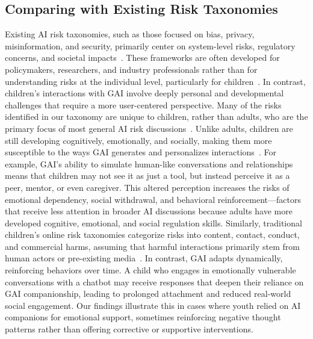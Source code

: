 \subsection{Comparing with Existing Risk Taxonomies}
\vspace{-3pt}
Existing AI risk taxonomies, such as those focused on bias, privacy, misinformation, and security, primarily center on system-level risks, regulatory concerns, and societal impacts~\cite{slattery2024ai,AVIDDatabasea}. These frameworks are often developed for policymakers, researchers, and industry professionals rather than for understanding risks at the individual level, particularly for children~\cite{zeng2024ai,wang2023decodingtrust}. In contrast, children’s interactions with GAI involve deeply personal and developmental challenges that require a more user-centered perspective. Many of the risks identified in our taxonomy are unique to children, rather than adults, who are the primary focus of most general AI risk discussions~\cite{slattery2024ai}. Unlike adults, children are still developing cognitively, emotionally, and socially, making them more susceptible to the ways GAI generates and personalizes interactions~\cite{neugnot2024future,hasse2019youth,casey2008adolescent,steinberg2018around}. For example, GAI’s ability to simulate human-like conversations and relationships means that children may not see it as just a tool, but instead perceive it as a peer, mentor, or even caregiver. This altered perception increases the risks of emotional dependency, social withdrawal, and behavioral reinforcement—factors that receive less attention in broader AI discussions because adults have more developed cognitive, emotional, and social regulation skills. Similarly, traditional children’s online risk taxonomies categorize risks into content, contact, conduct, and commercial harms, assuming that harmful interactions primarily stem from human actors or pre-existing media~\cite{livingstone2014their}. In contrast, GAI adapts dynamically, reinforcing behaviors over time. A child who engages in emotionally vulnerable conversations with a chatbot may receive responses that deepen their reliance on GAI companionship, leading to prolonged attachment and reduced real-world social engagement. Our findings illustrate this in cases where youth relied on AI companions for emotional support, sometimes reinforcing negative thought patterns rather than offering corrective or supportive interventions.

